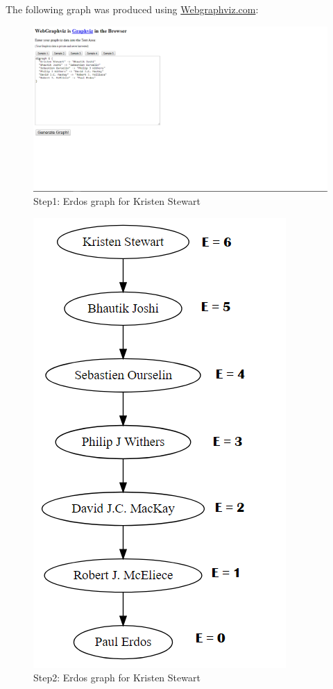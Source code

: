 \documentclass[letterpaper,11pt]{article}
\begin{document}
The following graph was produced using \url{Webgraphviz.com}:


\begin{figure}[h]
\centering
\includegraphics[scale=0.65]{1graph.png}
\caption{Step1: Erdos graph for Kristen Stewart}
\label{fig:q6graphviz}
\end{figure}


\begin{figure}[h]
\centering
\includegraphics[scale=0.65]{2graph.png}
\caption{Step2: Erdos graph for Kristen Stewart}
\label{fig:q62graphviz}
\end{figure}
\end{document}
